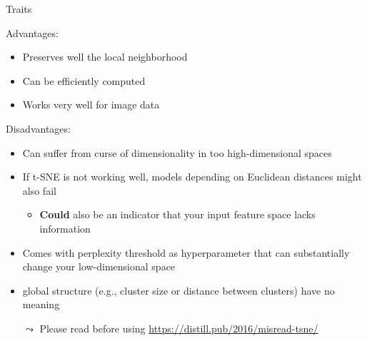 \documentclass[aspectratio=169]{../latex_main/tntbeamer}  %
\begin{document}
	
	\begin{frame}{Traits}
	    
	    Advantages:
	    \begin{itemize}
	        \item Preserves well the local neighborhood
	        \item Can be efficiently computed
	        \item Works very well for image data
	    \end{itemize}
	    
	    \pause
	    
	    Disadvantages:
	    \begin{itemize}
	        \item Can suffer from curse of dimensionality in too high-dimensional spaces
	        \item If t-SNE is not working well, models depending on Euclidean distances might also fail
	        \begin{itemize}
	            \item \textbf{Could} also be an indicator that your input feature space lacks information
	        \end{itemize}
	        \item Comes with perplexity threshold as hyperparameter that can substantially change your low-dimensional space
	        \item global structure (e.g., cluster size or distance between clusters) have no meaning
	        \item[$\leadsto$] Please read before using \url{https://distill.pub/2016/misread-tsne/}
	    \end{itemize}
	    
	\end{frame}
	
\end{document}
